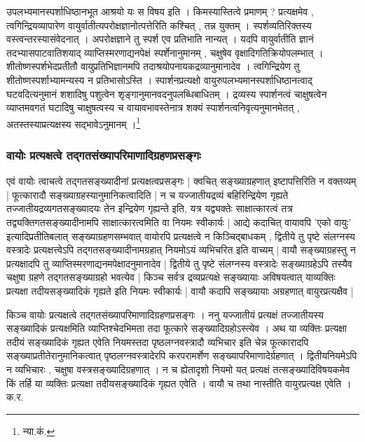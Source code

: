 {\fontsize{11.7}{0}\selectfont\s  उपलभ्यमानस्पर्शाधिष्ठानभूत आश्रयो यः स विषय इति । किमस्यास्तित्वे प्रमाणम् ? प्रत्यक्षमेव , त्वगिन्द्रियव्यापारेण वायुर्वातीत्यपरोक्षज्ञानोत्पत्तेरिति कश्चित् , तन्न युक्तम्  । स्पर्शव्यतिरिक्तस्य वस्त्वन्तरस्यासंवेदनात् । अपरोक्षज्ञाने तु स्पर्श एव प्रतिभाति नान्यत् । यदपि वायुर्वातीति ज्ञानं तदभ्यासपाटवातिशयाद् व्याप्तिस्मरणाद्यनपेक्षं स्पर्शेनानुमानम् , चक्षुषेव वृक्षादिगतिक्रियोपलम्भात् । शीतोष्णस्पर्शभेदप्रतीतौ वायुप्रतिभिज्ञानमपि तदाश्रयोपनायकद्रव्यानुमानादेव । त्वगिन्द्रियेण तु शीतोष्णस्पर्शाभ्यामन्यस्य न प्रतिभासोऽस्ति । स्पार्शनप्रत्यक्षो वायुरुपलभ्यमानस्पर्शाधिष्ठानत्वाद् घटवदित्यनुमानं शशादिषु पशुत्वेन शृङ्गानुमानवदनुपलब्धिबाधितम् । द्रव्यस्य स्पार्शनत्वं चाक्षुषत्वेन व्याप्तमवगतं घटादिषु चाक्षुषत्वस्य च वायावभावस्तेनात्र शक्यं स्पार्शनत्वनिवृत्यनुमानमेतत्  , अतस्तस्याप्रत्यक्षस्य सद्भावेऽनुमानम् ।\footnote{न्या.कं.}}

\subsubsection{वायोः प्रत्यक्षत्वे तद्गतसंख्यापरिमाणादिग्रहणप्रसङ्गः}

एवं वायोः त्वाचत्वे तद्गतसङ्ख्यादीनां प्रत्यक्षत्वप्रसङ्गः | क्वचित् सङ्ख्याग्रहणात् इष्टापत्तिरिति न वक्तव्यम् | फूत्कारादौ सङ्ख्याग्रहस्यानुमानिकत्वादिति | न च यज्जातीयद्रव्यं बहिरिन्द्रियेण गृह्यते तज्जातीयद्रव्यगतसङ्ख्यादयः तेन इन्द्रियेण गृह्यन्ते इति, यत्र यद्व्यक्तेः साक्षात्कारत्वं तत्र तद्व्यक्तिगतसङ्ख्यादीनामपि साक्षात्कारत्वमिति वा नियमः स्वीकार्यः | आद्ये कदाचित् वायावपि 'एको वायुः' इत्यादिप्रतीतिबलात् सङ्ख्याग्रहणसम्भवात् वायोरपि प्रत्यक्षत्वे न किञ्चिद्बाधकम् , द्वितीये तु पृष्टे संलग्नस्य वस्त्रादेः प्रत्यक्षत्त्वेऽपि तद्गतसङ्ख्यादीनामग्रहात् नियमोऽयं व्यभिचरित इति वाच्यम् | वायौ सङ्ख्याग्रहस्तु न प्रत्यक्षादपि तु  व्याप्तिस्मरणाद्यनमपेक्षादनुमानादेव | द्वितीये तु पृष्टे संलग्नस्य वस्त्रादेः‌ सङ्ख्याग्रहेऽपि तस्यैव चक्षुषा ग्रहणे तद्गतसङ्ख्याग्रहो भवत्येव |‌ किञ्च सर्वत्र द्रव्यप्रत्यक्षे सङ्ख्यायाः अविषयत्वात् याव्यक्तिः प्रत्यक्षा तदीयसङ्ख्यादिकं गृह्यते इति नियमः स्वीकार्यः | वायौ कदापि सङ्ख्यायाः अग्रहणात् वायुरप्रत्यक्षैव |

{\fontsize{11.7}{0}\selectfont\s किञ्च वायोः प्रत्यक्षत्वे तद्गतसंख्यापरिमाणादिग्रहणप्रसङ्गः । ननु यज्जातीयं प्रत्यक्षं तज्जातीयस्य सङ्ख्यादिकं प्रत्यक्षमिति व्याप्तिश्चेदभिमता तदा फूत्कारे सङ्ख्यादिग्रहोऽस्त्येव । अथ या व्यक्तिः प्रत्यक्षा तदीयं सङ्ख्यादिकं गृह्यत एवेति नियमस्तदा पृष्ठलग्नवस्त्रादौ व्यभिचार इति चेन्न फूत्कारादपि सङ्ख्याप्रतीतेरानुमानिकत्वात् पृष्ठलग्नवस्त्रादेरपि करपरामर्शेण सङ्ख्यापरिमाणादेर्ग्रहणात् । द्वितीयनियमेऽपि न व्यभिचारः , चक्षुषा वस्त्रसङ्ख्यादिग्रहणात् । न च ह्येतादृशो नियमो  यत् प्रत्यक्षं तत्सङ्ख्यादिविषयकमेव किं तर्हि या व्यक्तिः प्रत्यक्षा तदीयसङ्ख्यादिकं गृह्यत एवेति । वायौ च तथा नास्तीति वायुरप्रत्यक्ष एवेति ।{क.र.}}

